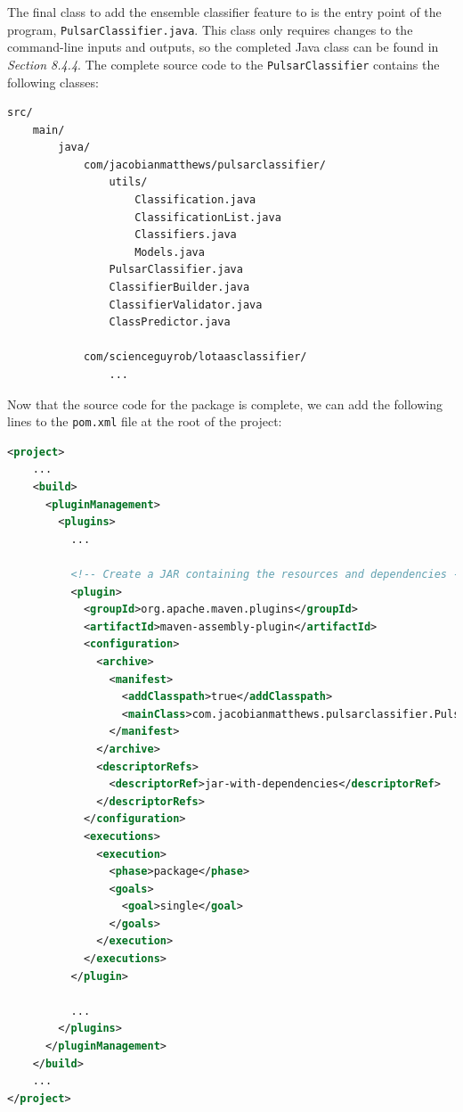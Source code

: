 \documentclass{article}
\begin{document}
The final class to add the ensemble classifier feature to is the entry point of the program, \verb|PulsarClassifier.java|. This class only requires changes to the command-line inputs and outputs, so the completed Java class can be found in \emph{Section 8.4.4}. The complete source code to the \verb|PulsarClassifier| contains the following classes:

\begin{lstlisting}[numbers=none]
src/
    main/
        java/
            com/jacobianmatthews/pulsarclassifier/
                utils/
                    Classification.java
                    ClassificationList.java
                    Classifiers.java
                    Models.java
                PulsarClassifier.java
                ClassifierBuilder.java
                ClassifierValidator.java
                ClassPredictor.java

            com/scienceguyrob/lotaasclassifier/
                ...

\end{lstlisting}

Now that the source code for the package is complete, we can add the following lines to the \verb|pom.xml| file at the root of the project:

\pagebreak
\begin{lstlisting}[numbers=none, language=xml, title=pom.xml, basicstyle=\footnotesize\ttfamily]
<project>
    ...
    <build>
      <pluginManagement>
        <plugins>
          ...

          <!-- Create a JAR containing the resources and dependencies -->
          <plugin>
            <groupId>org.apache.maven.plugins</groupId>
            <artifactId>maven-assembly-plugin</artifactId>
            <configuration>
              <archive>
                <manifest>
                  <addClasspath>true</addClasspath>
                  <mainClass>com.jacobianmatthews.pulsarclassifier.PulsarClassifier</mainClass>
                </manifest>
              </archive>
              <descriptorRefs>
                <descriptorRef>jar-with-dependencies</descriptorRef>
              </descriptorRefs>
            </configuration>
            <executions>
              <execution>
                <phase>package</phase>
                <goals>
                  <goal>single</goal>
                </goals>
              </execution>
            </executions>
          </plugin>

          ...
        </plugins>
      </pluginManagement>
    </build>
    ...
</project>
\end{lstlisting}
\end{document}
